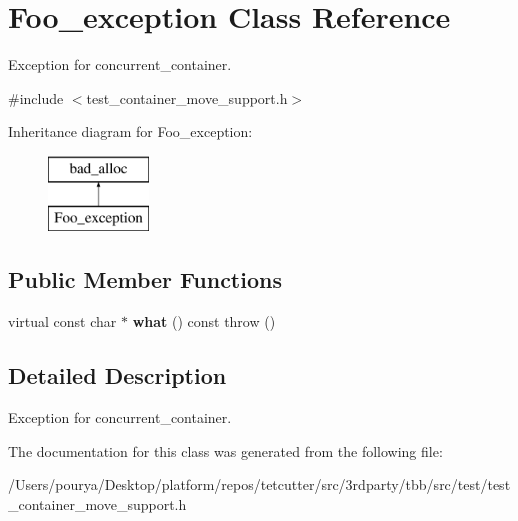 \hypertarget{classFoo__exception}{}\section{Foo\+\_\+exception Class Reference}
\label{classFoo__exception}


Exception for concurrent\+\_\+container.  




{\ttfamily \#include $<$test\+\_\+container\+\_\+move\+\_\+support.\+h$>$}

Inheritance diagram for Foo\+\_\+exception\+:\begin{figure}[H]
\begin{center}
\leavevmode
\includegraphics[height=2.000000cm]{classFoo__exception}
\end{center}
\end{figure}
\subsection*{Public Member Functions}
\begin{DoxyCompactItemize}
\item 
\hypertarget{classFoo__exception_a4d045e133205e0a8d4f78d61bfe03cb0}{}virtual const char $\ast$ {\bfseries what} () const   throw ()\label{classFoo__exception_a4d045e133205e0a8d4f78d61bfe03cb0}

\end{DoxyCompactItemize}


\subsection{Detailed Description}
Exception for concurrent\+\_\+container. 

The documentation for this class was generated from the following file\+:\begin{DoxyCompactItemize}
\item 
/\+Users/pourya/\+Desktop/platform/repos/tetcutter/src/3rdparty/tbb/src/test/test\+\_\+container\+\_\+move\+\_\+support.\+h\end{DoxyCompactItemize}

